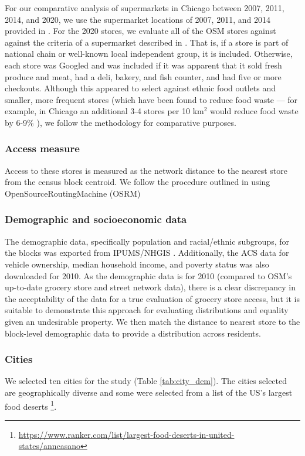 \documentclass[final,3p,times,onecolumn,sort&compress]{elsarticle}
\begin{document}
For our comparative analysis of supermarkets in Chicago between 2007, 2011, 2014, and 2020, we use the supermarket locations of 2007, 2011, and 2014 provided in \cite{Kolak2018-data}.
For the 2020 stores, we evaluate all of the OSM stores against against the criteria of a supermarket described in \citep{Kolak2018-az}.
That is, if a store is part of national chain or well-known local independent group, it is included.
Otherwise, each store was Googled and was included if it was apparent that it sold fresh produce and meat, had a deli, bakery, and fish counter, and had five or more checkouts.
Although this appeared to select against ethnic food outlets and smaller, more frequent stores (which have been found to reduce food waste --- for example, in Chicago an additional 3-4 stores per 10 km$^2$ would reduce food waste by 6-9\% \citep{Belavina2020-ui}), we follow the methodology for comparative purposes.

\subsubsection{Access measure}
Access to these stores is measured as the network distance to the nearest store from the census block centroid.
We follow the procedure outlined in \cite{Logan2019-fr} using OpenSourceRoutingMachine (OSRM)

\subsubsection{Demographic and socioeconomic data}
The demographic data, specifically population and racial/ethnic subgroups, for the blocks was exported from IPUMS/NHGIS \citep{Manson2018-ug}.
Additionally, the ACS data for vehicle ownership, median household income, and poverty status was also downloaded for 2010.
As the demographic data is for 2010 (compared to OSM's up-to-date grocery store and street network data), there is a clear discrepancy in the acceptability of the data for a true evaluation of grocery store access, but it is suitable to demonstrate this approach for evaluating distributions and equality given an undesirable property. 
We then match the distance to nearest store to the block-level demographic data to provide a distribution across residents.

\subsubsection{Cities}
We selected ten cities for the study (Table \ref{tab:city_dem}).
The cities selected are geographically diverse and some were selected from a list of the US's largest food deserts \footnote{\url{https://www.ranker.com/list/largest-food-deserts-in-united-states/anncasano}}. 
\end{document}
